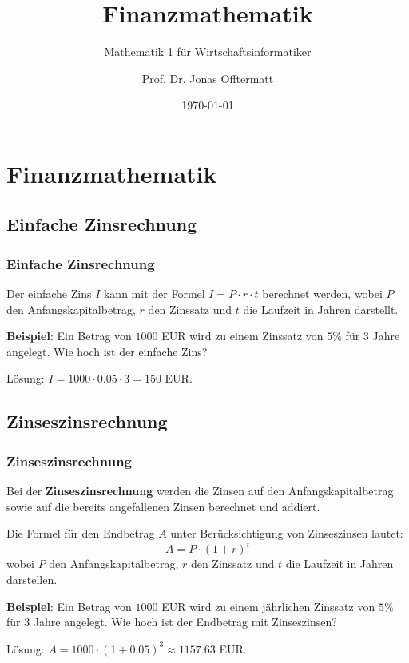 \documentclass{beamer}
\title{Finanzmathematik}
\subtitle{Mathematik 1 für Wirtschaftsinformatiker}
\author{Prof. Dr. Jonas Offtermatt}
\date{\today}
\begin{document}
\section{Finanzmathematik}
\subsection{Einfache Zinsrechnung}
\begin{frame}
  \frametitle{Einfache Zinsrechnung}
  
  Der einfache Zins $I$ kann mit der Formel $I = P \cdot r \cdot t$ berechnet werden, 
  wobei $P$ den Anfangskapitalbetrag, $r$ den Zinssatz und $t$ die Laufzeit in Jahren darstellt.
  
  \vspace{0.5cm}
  
  \textbf{Beispiel}: Ein Betrag von $1000$ EUR wird zu einem Zinssatz von $5\%$ für $3$ Jahre angelegt. Wie hoch ist der einfache Zins?
  
  \vspace{0.3cm}
  
  Lösung: $I = 1000 \cdot 0.05 \cdot 3 = 150$ EUR.
\end{frame}

\subsection{Zinseszinsrechnung}
\begin{frame}
  \frametitle{Zinseszinsrechnung}
  
  Bei der \textbf{Zinseszinsrechnung} werden die Zinsen auf den Anfangskapitalbetrag sowie auf die bereits angefallenen Zinsen berechnet und addiert.
  
  \vspace{0.3cm}
  
  Die Formel für den Endbetrag $A$ unter Berücksichtigung von Zinseszinsen lautet: $$A = P \cdot (1 + r)^t$$ 
  wobei $P$ den Anfangskapitalbetrag, $r$ den Zinssatz und $t$ die Laufzeit in Jahren darstellen.
  
  \vspace{0.5cm}
  
  \textbf{Beispiel}: Ein Betrag von $1000$ EUR wird zu einem jährlichen Zinssatz von $5\%$ für $3$ Jahre angelegt. Wie hoch ist der Endbetrag mit Zinseszinsen?
  
  \vspace{0.3cm}
  
  Lösung: $A = 1000 \cdot (1 + 0.05)^3 \approx 1157.63$ EUR.
\end{frame}
\end{document}
